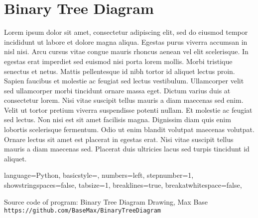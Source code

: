 \documentclass{article}
\begin{document}
\section{Binary Tree Diagram} 


Lorem ipsum dolor sit amet, consectetur adipiscing elit, sed do eiusmod tempor incididunt ut labore et dolore magna aliqua. Egestas purus viverra accumsan in nisl nisi. Arcu cursus vitae congue mauris rhoncus aenean vel elit scelerisque. In egestas erat imperdiet sed euismod nisi porta lorem mollis. Morbi tristique senectus et netus. Mattis pellentesque id nibh tortor id aliquet lectus proin. Sapien faucibus et molestie ac feugiat sed lectus vestibulum. Ullamcorper velit sed ullamcorper morbi tincidunt ornare massa eget. Dictum varius duis at consectetur lorem. Nisi vitae suscipit tellus mauris a diam maecenas sed enim. Velit ut tortor pretium viverra suspendisse potenti nullam. Et molestie ac feugiat sed lectus. Non nisi est sit amet facilisis magna. Dignissim diam quis enim lobortis scelerisque fermentum. Odio ut enim blandit volutpat maecenas volutpat. Ornare lectus sit amet est placerat in egestas erat. Nisi vitae suscipit tellus mauris a diam maecenas sed. Placerat duis ultricies lacus sed turpis tincidunt id aliquet.

\lstset
{
    language=Python,
    basicstyle=\footnotesize,
    numbers=left,
    stepnumber=1,
    showstringspaces=false,
    tabsize=1,
    breaklines=true,
    breakatwhitespace=false,
}




\medskip

\begin{thebibliography}{9}

\bibitem{} 
Source code of program: Binary Tree Diagram Drawing, Max Base
\\\texttt{https://github.com/BaseMax/BinaryTreeDiagram}
\end{thebibliography}
\end{document}
